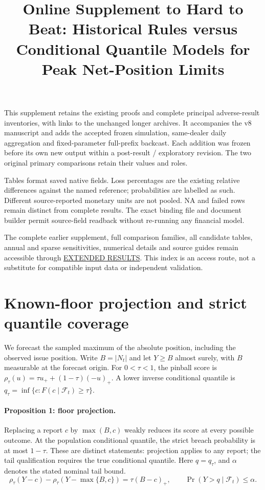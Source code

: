 \documentclass[11pt,a4paper]{article}
\title{Online Supplement to Hard to Beat: Historical Rules versus Conditional Quantile Models for Peak Net-Position Limits}
\author{}
\date{}
\begin{document}
\maketitle
This supplement retains the existing proofs and complete principal adverse-result
inventories, with links to the unchanged longer archives. It accompanies the
v8 manuscript and adds the accepted frozen simulation, same-dealer daily
aggregation and fixed-parameter full-prefix backcast. Each addition was frozen
before its own new output within a post-result / exploratory revision. The
two original primary comparisons retain their values and roles.

Tables format saved native fields. Loss percentages are the existing relative
differences against the named reference; probabilities are labelled as such.
Different source-reported monetary units are not pooled. NA and failed rows
remain distinct from complete results. The exact binding file and document
builder permit source-field readback without re-running any financial model.

The complete earlier supplement, full comparison families, all candidate
tables, annual and sparse sensitivities, numerical details and source guides
remain accessible through \href{https://github.com/ByronLi0207/financial-mathematics-paper-20261020/blob/revision-v7-final/EXTENDED_RESULTS.md}{EXTENDED RESULTS}.
This index is an access route, not a substitute for compatible input data or
independent validation.
\section{Known-floor projection and strict quantile coverage}\label{sup:floor}

We forecast the sampled maximum of the absolute position, including
the observed issue position. Write \(B=|N_t|\) and let \(Y\ge B\) almost surely,
with \(B\) measurable at the forecast origin. For \(0<\tau<1\), the pinball score is
\(\rho_\tau(u)=\tau u_+ +(1-\tau)(-u)_+\). A lower inverse conditional quantile
is \(q_\tau=\inf\{c:F(c\mid\mathcal F_t)\ge\tau\}\).

\paragraph{Proposition 1: floor projection.}
Replacing a report \(c\) by \(\max(B,c)\) weakly reduces its score at every possible
outcome. At the population conditional quantile, the strict breach probability
is at most \(1-\tau\). These are distinct statements: projection applies to any
report; the tail qualification requires the true conditional quantile.
Here \(q=q_\tau\), and \(\alpha\) denotes the stated nominal tail bound.
\[
\rho_\tau(Y-c)-\rho_\tau(Y-\max\{B,c\})=\tau(B-c)_+,\qquad \Pr(Y>q\mid\mathcal F_t)\le\alpha.
\]
\end{document}
